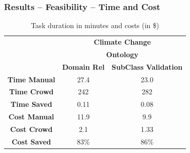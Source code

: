 \documentclass{beamer}
\begin{document}
\begin{frame}
  \frametitle{Results -- Feasibility -- Time and Cost}
        \begin{table}
        \small
        \center
        \begin{tabular}{|c|c|c|} \hline
            & \multicolumn{2}{|c|}{\textbf{Climate Change}} \\ 
                & \multicolumn{2}{|c|}{\textbf{Ontology}} \\ 
                  \cline{2-3}
                & \textbf{Domain Rel} & \textbf{SubClass Validation} \\ \hline

        \textbf{Time Manual}         & 27.4    & 23.0  \\ \hline
        \textbf{Time Crowd}          & 242     & 282   \\ \hline
        \textbf{Time Saved}          & 0.11    & 0.08  \\ \hline
 
        \textbf{Cost Manual}         &  11.9   & 9.9   \\ \hline
        \textbf{Cost Crowd}          &  2.1    & 1.33  \\ \hline %
        \textbf{Cost Saved}     &  83\%   & 86\%  \\ \hline
         \end{tabular}
        \caption{Task duration in minutes and costs (in \$)}


    \label{table:eval_qual}
\end{table}

\end{frame}
\end{document}
